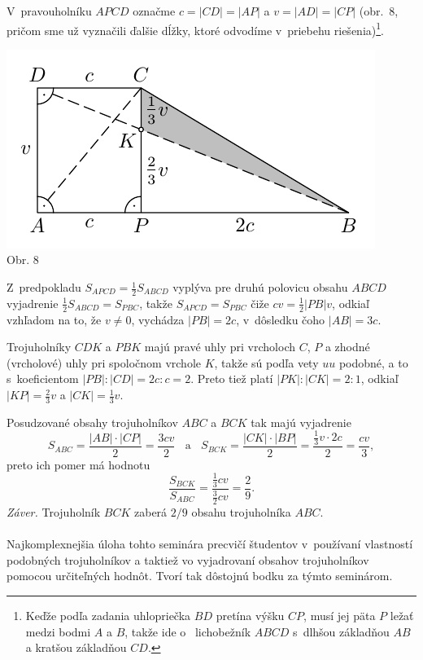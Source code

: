 \rieh V~pravouholníku $APCD$ označme $c = |CD| = |AP|$ a $v = |AD| = |CP|$ (obr.~8, pričom sme už vyznačili ďalšie dĺžky, ktoré odvodíme v~priebehu riešenia)\footnote{Keďže podľa zadania uhlopriečka $BD$ pretína výšku $CP$, musí jej päta $P$ ležať medzi bodmi $A$ a $B$, takže ide o~ lichobežník $ABCD$ s~dlhšou základňou $AB$ a kratšou základňou $CD$.}.
\begin{center}
\includegraphics{obrazky/65K3}\\

Obr. 8
\end{center}
Z~predpokladu $S_{APCD} =\frac{1}{2}S_{ABCD}$ vyplýva pre druhú polovicu obsahu $ABCD$ vyjadrenie $\frac{1}{2}S_{ABCD} = S_{PBC}$, takže $S_{APCD} = S_{PBC}$ čiže $cv =\frac{1}{2}|PB|v$, odkiaľ vzhľadom na to, že $v \neq 0$, vychádza $|PB| = 2c$, v~dôsledku čoho $|AB| = 3c$.

Trojuholníky $CDK$ a $PBK$ majú pravé uhly pri vrcholoch $C$, $P$ a zhodné (vrcholové) uhly pri spoločnom vrchole $K$, takže sú podľa vety $uu$ podobné, a to s~koeficientom $|PB| : |CD| = 2c : c = 2$. Preto tiež platí $|PK| : |CK| = 2 : 1$, odkiaľ $|KP| =\frac{2}{3}v$ a $|CK| =\frac{1}{3}v$.

Posudzované obsahy trojuholníkov $ABC$ a $BCK$ tak majú vyjadrenie
$$S_{ABC} = \frac{|AB| \cdot |CP|}{2}=\frac{3cv}{2} \ \ \ \ \text{a} \ \ \ \  S_{BCK} =\frac{|CK|\cdot |BP|}{2}=\frac{\frac{1}{3}v\cdot 2c}{2}=\frac{cv}{3},$$
preto ich pomer má hodnotu
$$\frac{S_{BCK}}{S_{ABC}}=\frac{\frac{1}{3}cv}{\frac{3}{2}cv}=\frac{2}{9}.$$
\textit{Záver.} Trojuholník $BCK$ zaberá $2/9$ obsahu trojuholníka $ABC$.\\
\\
\kom Najkomplexnejšia úloha tohto seminára precvičí študentov v~používaní vlastností podobných trojuholníkov a taktiež vo vyjadrovaní obsahov trojuholníkov pomocou určiteľných hodnôt. Tvorí tak dôstojnú bodku za týmto seminárom.

